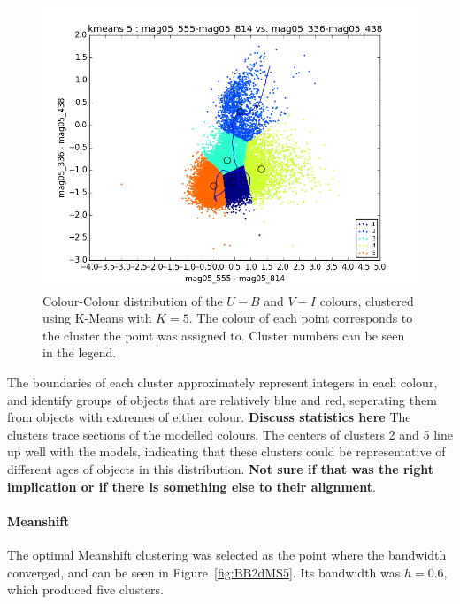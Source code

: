 \begin{figure}[H]
\centering
\includegraphics[width=\linewidth]{figs/broad/kmeans_color_5cl_mag05_555-mag05_814vsmag05_336-mag05_438}
\caption{Colour-Colour distribution of the $U - B$ and $V - I$ colours, clustered using K-Means with $K=5$. The colour of each point corresponds to the cluster the point was assigned to. Cluster numbers can be seen in the legend.}
\label{fig:BB2dKM5}
\end{figure}

The boundaries of each cluster approximately represent integers in each colour, and identify groups of objects that are relatively blue and red, seperating them from objects with extremes of either colour.
\textbf{Discuss statistics here}
The clusters trace sections of the modelled colours. 
The centers of clusters 2 and 5 line up well with the models, indicating that these clusters could be representative of different ages of objects in this distribution.
\textbf{Not sure if that was the right implication or if there is something else to their alignment}. 

\paragraph{Meanshift}
The optimal Meanshift clustering was selected as the point where the bandwidth converged, and can be seen in Figure~\ref{fig:BB2dMS5}.
Its bandwidth was $h=0.6$, which produced five clusters.

